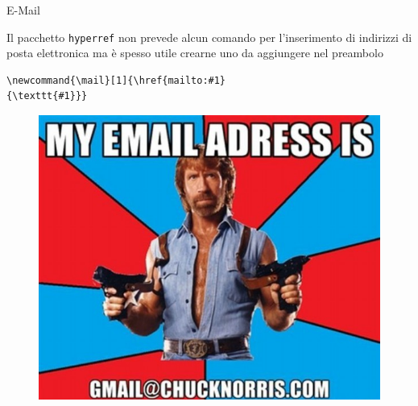 \begin{frame}[fragile]{E-Mail}

Il pacchetto \texttt{hyperref} non prevede alcun comando per l'inserimento di
indirizzi di posta elettronica ma è spesso utile crearne uno da aggiungere nel
preambolo

\begin{lstlisting}
\newcommand{\mail}[1]{\href{mailto:#1}
{\texttt{#1}}}
\end{lstlisting}

\begin{figure}
	\centering
	\includegraphics[scale=0.25]{res/images/email}
\end{figure}

\end{frame}